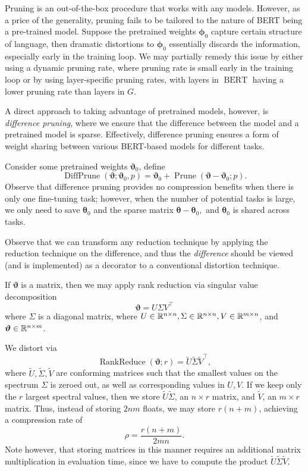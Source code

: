 \documentclass[10pt]{article}
\newcommand{\bert}{\operatorname{BERT}}
\newcommand{\prune}{\operatorname{Prune}}
\newcommand{\diffprune}{\operatorname{DiffPrune}}
\newcommand{\rankreduce}{\operatorname{RankReduce}}
\newcommand{\btheta}{{\bm{\theta}}}
\newcommand{\bphi}{{\bm{\phi}}}
\newcommand{\bvartheta}{{\bm{\vartheta}}}
\begin{document}
  Pruning is an out-of-the-box procedure that works with any models. However,
  as a price of the generality, pruning fails to be tailored to the nature of
  BERT being a pre-trained model. Suppose the pretrained weights $\bphi_0 $
  capture certain structure of language, then dramatic distortions to
  $\bphi_0$ essentially discards the information, especially early in the
  training loop. We may partially remedy this issue by either using a dynamic
  pruning rate, where pruning rate is small early in the training loop or by
  using layer-specific pruning rates, with layers in $\bert$ having a lower
  pruning rate than layers in $G$. 
  
  A direct approach to taking advantage of pretrained models, however, is
  \emph{difference pruning}, where we ensure that the difference between the
  model and a pretrained model is sparse. Effectively, difference pruning
  ensures a form of weight sharing between various BERT-based models for
  different tasks.
  
 Consider some pretrained weights
$\bvartheta_0$, define \[
\diffprune(\bvartheta; \bvartheta_0, p ) = \bvartheta_0 + \prune(\bvartheta -
\bvartheta_0 ; p). 
\]
Observe that difference pruning provides no compression benefits when there is
only one fine-tuning task; however, when the number of potential tasks is
large, we only need to save $\btheta_0$ and the sparse matrix $\btheta -
\btheta_0,$ and $\btheta_0$ is shared across tasks.

Observe that we can transform any reduction technique by applying the
reduction technique on the difference, and thus the \emph{difference} should
be viewed (and is implemented) as a decorator to a conventional distortion
technique.


 If $\bvartheta$ is a matrix, then we may apply
rank
reduction via singular value decomposition \[
\bvartheta = U\Sigma V^\top
\]
where $\Sigma$ is a diagonal matrix, where $U \in \mathbb{R}^{n\times n}, \Sigma\in \mathbb{R}^
{n\times n}, V\in \mathbb{R}^{m\times n}$, and $\bvartheta \in \R^{n\times m}$.

We distort via \[
\rankreduce(\bvartheta; r) = \tilde U \tilde \Sigma \tilde V^\top,
\]
where $\tilde U, \tilde \Sigma, \tilde V$ are conforming matrices such that the
smallest values on the spectrum $\Sigma$ is zeroed out, as well as corresponding
values in $U,V$. If we keep only the $r$ largest spectral values, then we store
$\tilde U \tilde \Sigma$, an $n\times r$ matrix, and $\tilde V$, an $m\times r$
matrix. Thus, instead of storing $2nm$ floats, we may store $r(n+m)$, achieving
a compression rate of \[
\rho = \frac{r(n+m)}{2mn}.
\]
Note however, that storing matrices in this manner requires an additional
matrix multiplication in evaluation time, since we have to compute the product
$\tilde U \tilde \Sigma \tilde V$.
\end{document}
